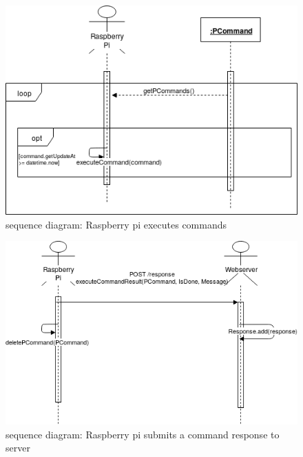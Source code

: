 \documentclass[12pt, oneside, a4paper]{book}
\begin{document}
				\begin{figure}[H]
					\caption{sequence diagram: Raspberry pi executes commands}					\label{rp_execute}
					\includegraphics[width=\linewidth]{img/sequence_execute.png}
				\end{figure}
				\begin{figure}[H]
					\caption{sequence diagram: Raspberry pi submits a command response to server}
					\label{rp_response}
					\includegraphics[width=\linewidth]{img/sequence_submit_response.png}
				\end{figure}
\end{document}
